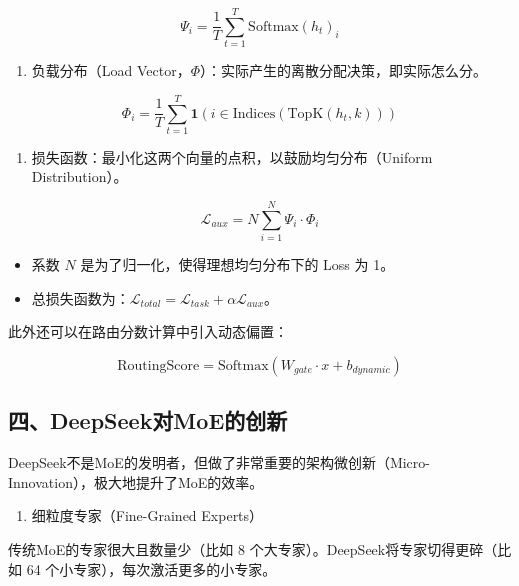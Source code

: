 \[
\Psi_i = \frac{1}{T}\sum_{t=1}^{T}\mathrm{Softmax}(h_t)_i
\]

\begin{enumerate}
\def\labelenumi{\arabic{enumi}.}
\setcounter{enumi}{1}
\tightlist
\item
  负载分布（Load Vector，\(\Phi\)）：实际产生的离散分配决策，即实际怎么分。
\end{enumerate}

\[
\Phi_i = \frac{1}{T}\sum_{t=1}^{T}\mathbf{1}\left(i \in \mathrm{Indices}(\mathrm{TopK}(h_t,k))\right)
\]

\begin{enumerate}
\def\labelenumi{\arabic{enumi}.}
\setcounter{enumi}{2}
\tightlist
\item
  损失函数：最小化这两个向量的点积，以鼓励均匀分布（Uniform Distribution）。
\end{enumerate}

\[
\mathcal{L}_{aux} = N\sum_{i=1}^{N}\Psi_i \cdot \Phi_i
\]

\begin{itemize}
\tightlist
\item
  系数 \(N\) 是为了归一化，使得理想均匀分布下的 Loss 为 1。
\item
  总损失函数为：\(\mathcal{L}_{total}=\mathcal{L}_{task}+\alpha\mathcal{L}_{aux}\)。
\end{itemize}

此外还可以在路由分数计算中引入动态偏置：

\[
\mathrm{RoutingScore}=\mathrm{Softmax}(W_{gate}\cdot x+b_{dynamic})
\]

\hypertarget{ux56dbdeepseekux5bf9moeux7684ux521bux65b0}{%
\subsection{四、DeepSeek对MoE的创新}\label{ux56dbdeepseekux5bf9moeux7684ux521bux65b0}}

DeepSeek不是MoE的发明者，但做了非常重要的架构微创新（Micro-Innovation），极大地提升了MoE的效率。

\begin{enumerate}
\def\labelenumi{\arabic{enumi}.}
\tightlist
\item
  细粒度专家（Fine-Grained Experts）
\end{enumerate}

传统MoE的专家很大且数量少（比如 8 个大专家）。DeepSeek将专家切得更碎（比如 64 个小专家），每次激活更多的小专家。


